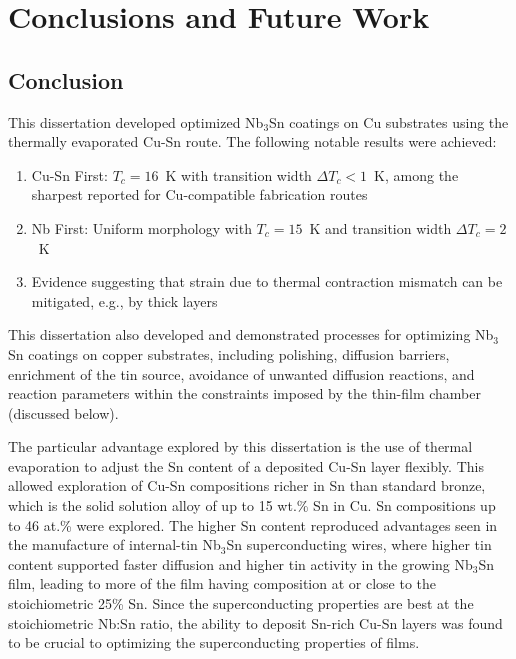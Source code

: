 \chapter{Conclusions and Future Work}

\section{Conclusion}


This dissertation developed optimized Nb$_3$Sn coatings on Cu substrates using the thermally evaporated Cu-Sn route. The following notable results were achieved:

\begin{enumerate}
    \item Cu-Sn First: $T_c = 16$~K with transition width $\Delta T_c < 1$~K, among the sharpest reported for Cu-compatible fabrication routes
    \item Nb First: Uniform morphology with $T_c = 15$~K and transition width $\Delta T_c = 2$~K
    \item  Evidence suggesting that strain due to thermal contraction mismatch can be mitigated, e.g., by thick layers
\end{enumerate}

This dissertation also developed and demonstrated processes for optimizing Nb$_3$Sn coatings on copper substrates, including polishing, diffusion barriers, enrichment of the tin source, avoidance of unwanted diffusion reactions, and reaction parameters within the constraints imposed by the thin-film chamber (discussed below). 

The particular advantage explored by this dissertation is the use of thermal evaporation to adjust the Sn content of a deposited Cu-Sn layer flexibly. This allowed exploration of Cu-Sn compositions richer in Sn than standard bronze, which is the solid solution alloy of up to 15 wt.\% Sn in Cu. Sn compositions up to 46 at.\% were explored. The higher Sn content reproduced advantages seen in the manufacture of internal-tin Nb$_3$Sn superconducting wires, where higher tin content supported faster diffusion and higher tin activity in the growing Nb$_3$Sn film, leading to more of the film having composition at or close to the stoichiometric 25\% Sn. Since the superconducting properties are best at the stoichiometric Nb:Sn ratio, the ability to deposit Sn-rich Cu-Sn layers was found to be crucial to optimizing the superconducting properties of films.

